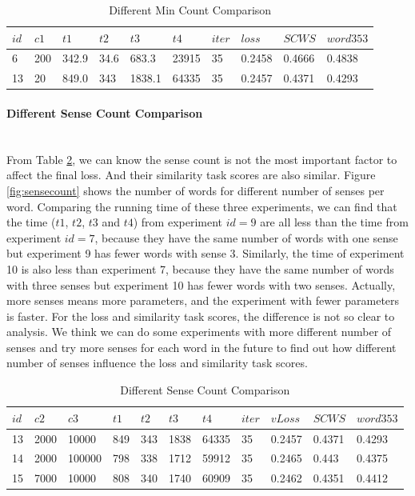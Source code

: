 \begin{table}[tb]
\caption{Different Min Count Comparison} \label{tab:group2} 
\begin{center}
\begin{tabular}{|l|l|l|l|l|l|l|l|l|l|}
\hline
$id$& $c1$ & $t1$ & $t2$  & $t3$ & $t4$ & $iter$ & $loss$ & $SCWS$ & $word353$	   \\ 
\hline
6 	&  200 	& 342.9	& 34.6	& 683.3 &	23915  & 35 & 0.2458 &0.4666 & 0.4838  \\ 
\hline
13	&  20	& 849.0	& 343	& 1838.1 &	64335  & 35 & 0.2457 &0.4371	& 0.4293    \\ 
\hline
\end{tabular}
\end{center}
\end{table}

\clearpage %

\paragraph{Different Sense Count Comparison} \ \\
From Table \ref{tab:group3}, we can know the sense count is not the most important factor to affect the final loss. And their similarity task scores are also similar. Figure \ref{fig:sensecount} shows the number of words for different number of senses per word.  Comparing the running time of these three experiments, we can find that the time ($t1$, $t2$, $t3$ and $t4$) from experiment $id=9$ are all less than the time from experiment $id=7$, because they have the same number of words with one sense but experiment 9 has fewer words with sense 3. Similarly, the time of experiment 10 is also less than experiment 7, because they have the same number of words with three senses but experiment 10 has fewer words with two senses. Actually, more senses means more parameters, and the experiment with fewer parameters is faster. For the loss and similarity task scores, the difference is not so clear to analysis. We think we can do some experiments with more different number of senses and try more senses for each word in the future to find out how different number of senses influence the loss and similarity task scores.

\begin{table}[tb]
\caption{Different Sense Count Comparison} \label{tab:group3} 
\begin{center}
\begin{tabular}{|l|l|l|l|l|l|l|l|l|l|l|}
\hline
$id$ & $c2$ & $c3$ & $t1$ & $t2$  & $t3$ & $t4$ & $iter$ &  $vLoss$  &  $SCWS$ & 	$word353$	   \\ 

\hline
13	& 2000 & 10000	& 849	& 343	& 1838 &	64335  & 35	& 0.2457 &0.4371	&0.4293	  \\ 
\hline
14 	& 2000 & 100000 	& 798	& 338	& 1712 &	59912  & 35	& 0.2465 &0.443 & 0.4375  \\ 
\hline
15 	& 7000 & 10000 	& 808	& 340	& 1740  &60909  & 35 & 0.2462 &0.4351 & 0.4412  \\ 
\hline
\end{tabular}
\end{center}
\end{table}


